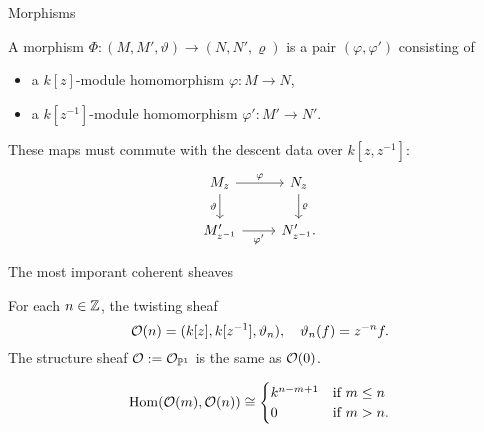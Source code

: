 \documentclass[
  xcolor=dvipsnames,
  aspectratio=169,
  compress
]{beamer}
\begin{document}
\begin{frame}[fragile]{Morphisms}
  \begin{definition}
    A \alert{morphism} $\Phi: (M, M', \vartheta) \to (N, N', \varrho)$ is a pair $(\varphi, \varphi')$ consisting of
    \begin{itemize}
      \item a $k[z]$-module homomorphism $\varphi: M \to N$,
      \item a $k[z^{-1}]$-module homomorphism $\varphi': M' \to N'$.
    \end{itemize}

    These maps must commute with the descent data over $k[z, z^{-1}]$:
    \[
      \begin{tikzcd}
        {M_z} & {N_z} \\
        {M'_{z^{-1}}} & {N'_{z^{-1}}}.
        \arrow["{\varphi}", from=1-1, to=1-2]
        \arrow["\vartheta"', from=1-1, to=2-1]
        \arrow["\varrho", from=1-2, to=2-2]
        \arrow["{\varphi'}"', from=2-1, to=2-2]
      \end{tikzcd}
    \]
  \end{definition}
\end{frame}

\begin{frame}{The most imporant coherent sheaves}
  \begin{example}
    For each $n \in \mathbb{Z}$, the \alert{twisting sheaf}
    \[
      \mathcal{O}({n}) = (k[z], k[z^{-1}], \vartheta_n),
      \quad
      \vartheta_n(f) = z^{-n} f.
    \]
    The structure sheaf $\mathcal{O} := \mathcal{O}_{{\mathbb{P}^{{1}}}}$ is the same as $\mathcal{O}({0})$.
  \end{example}

  \pause

  \begin{fact}
    \[
      \operatorname{Hom}(\mathcal{O}({m}), \mathcal{O}({n}))
      \cong
      \begin{cases}
        k^{n - m + 1} & \text{if } m \leq n \\
        0             & \text{if } m > n.
      \end{cases}
    \]
  \end{fact}
\end{frame}

\iffalse
\begin{frame}{As a category}
  $\Coh(\proj{1})$ has lots of interesting structure.
  It is
  \begin{itemize}
      \pause
    \item $k$-linear (i.e. every hom-set is a vector space over $k$),

      \pause
    \item additive (i.e. there is a \alert{zero sheaf}, can take finite \alert{direct sums}),

      \pause
    \item abelian (i.e. can take \alert{(co)kernels}, \alert{images}, \alert{quotients}, \alert{exact sequences}),

      \pause
    \item symmetric monoidal (i.e. can take \alert{tensor products}).
  \end{itemize}
\end{frame}
\fi
\end{document}
